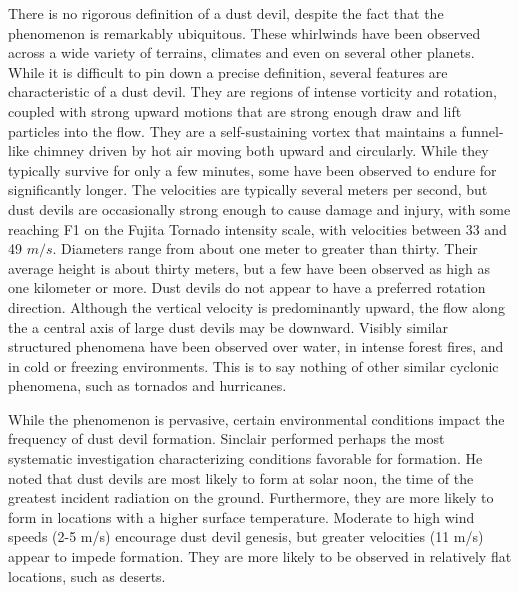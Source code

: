 There is no rigorous definition of a dust devil, despite the fact that
the phenomenon is remarkably ubiquitous. These whirlwinds have been
observed across a wide variety of terrains, climates and even on several
other planets\cite{Sinclair1969,Bluestein2004,JGR:JGR13978,JGRE:JGRE1660}. 
While it is difficult to pin down a precise definition, several features 
are characteristic of a dust devil. They are regions of
intense vorticity and rotation, coupled with strong upward motions 
that are strong enough draw and lift particles into the flow.
They are a self-sustaining vortex that maintains a funnel-like
chimney driven by hot air moving both upward and circularly. 
While they typically survive for only a few minutes, some have 
been observed to endure for significantly longer. The velocities are 
typically several meters per second, but
%
%
dust devils are occasionally strong enough to cause damage and injury,
with some reaching F1 on the Fujita Tornado intensity
scale\cite{Edwards_tornadointensity}, with velocities between 33 and 49
$m/s$. 
%
%
Diameters range from about one meter to greater than thirty.  Their
average height is about thirty meters, but a few have been observed 
as high as one kilometer or more. Dust devils do not appear to have a
preferred rotation direction. Although the vertical velocity 
is predominantly upward, the flow along the a central axis of large dust
devils may be downward. 
%
%
Visibly similar structured phenomena have been observed over water, in
intense forest fires, and in cold or freezing environments. 
%
%
This is to say nothing of other similar cyclonic phenomena, such as
tornados and hurricanes. 

While the phenomenon is pervasive, certain 
environmental conditions impact the frequency of dust devil formation.
Sinclair\cite{Sinclair1969} performed perhaps the most 
systematic investigation characterizing conditions favorable for
formation. He noted that dust devils are most
likely to form at solar noon, the time of the greatest incident radiation 
on the ground. Furthermore, they are more likely to form in locations 
with a higher surface temperature. Moderate to high wind speeds (2-5
m/s) encourage dust devil genesis, but greater velocities (11 m/s)
appear to impede formation. They are more likely to be observed in
relatively flat locations, such as deserts.  

